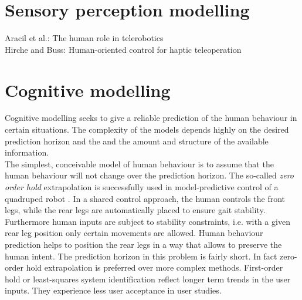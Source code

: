 \documentclass[a4paper,twoside, openright,12pt]{report}
\begin{document}
     
\section{Sensory perception modelling}
Aracil et al.: The human role in telerobotics\\
Hirche and Buss: Human-oriented control for haptic teleoperation
\section{Cognitive modelling}
Cognitive modelling seeks to give a reliable prediction of the human behaviour in certain situations. The complexity of the models depends highly on the desired prediction horizon and the and the amount and structure of the available information.\\
The simplest, conceivable model of human behaviour is to assume that the human behaviour will not change over the prediction horizon. The so-called \emph{zero order hold} extrapolation is successfully used in model-predictive control of a quadruped robot \cite{Chipalkatty2013}. In a shared control approach, the human controls the front legs, while the rear legs are automatically placed to ensure gait stability. Furthermore human inputs are subject to stability constraints, i.e. with a given rear leg position only certain movements are allowed. Human behaviour prediction helps to position the rear legs in a way that allows to preserve the human intent. The prediction horizon in this problem is fairly short. In fact zero-order hold extrapolation is preferred over more complex methods. First-order hold or least-squares system identification reflect longer term trends in the user inputs. They experience less user acceptance in user studies.\\
\end{document}
